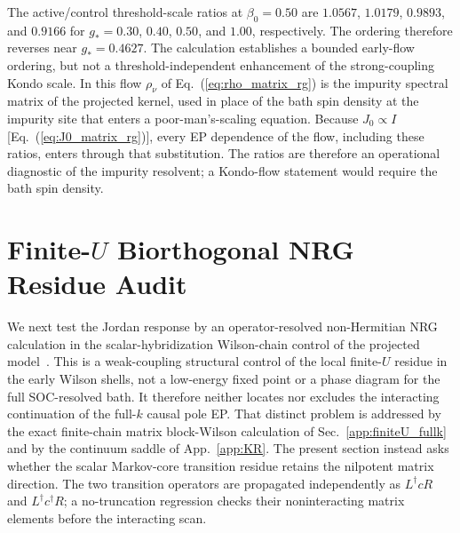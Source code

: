 \documentclass[%
  aps,physrev,onecolumn,10pt,amsmath,amssymb,superscriptaddress,longbibliography,floatfix
]{revtex4-2}
\begin{document}
The active/control threshold-scale ratios at $\beta_0=0.50$ are
$1.0567$, $1.0179$, $0.9893$, and $0.9166$ for
$g_\ast=0.30$, $0.40$, $0.50$, and $1.00$, respectively.  The ordering
therefore reverses near $g_\ast=0.4627$.  The calculation establishes a
bounded early-flow ordering, but not a threshold-independent
enhancement of the strong-coupling Kondo scale.  In this flow $\rho_\nu$ of
Eq.~(\ref{eq:rho_matrix_rg}) is the impurity spectral matrix of the projected
kernel, used in place of the bath spin density at the impurity site that
enters a poor-man's-scaling equation.  Because $J_0\propto I$
[Eq.~(\ref{eq:J0_matrix_rg})], every EP dependence of the flow, including
these ratios, enters through that substitution.  The ratios are therefore an
operational diagnostic of the impurity resolvent; a Kondo-flow statement would
require the bath spin density.

\section{Finite-\texorpdfstring{$U$}{U} Biorthogonal NRG Residue Audit}
\label{app:nrg_jordan}

We next test the Jordan response by an operator-resolved non-Hermitian NRG
calculation in the scalar-hybridization Wilson-chain control of the projected
model~\cite{burke2025non}.  This is a weak-coupling structural control of the
local finite-$U$ residue in the early Wilson shells, not a low-energy fixed
point or a phase diagram for the full SOC-resolved bath.  It therefore
neither locates nor excludes the interacting continuation of the full-$k$
causal pole EP.  That distinct problem is addressed by the exact finite-chain
matrix block-Wilson calculation of Sec.~\ref{app:finiteU_fullk} and by the
continuum saddle of App.~\ref{app:KR}.  The present
section instead asks whether the scalar Markov-core transition residue retains
the nilpotent matrix direction.  The
two transition operators are propagated independently as
$L^\dagger cR$ and $L^\dagger c^\dagger R$; a no-truncation regression checks
their noninteracting matrix elements before the interacting scan.
\end{document}
